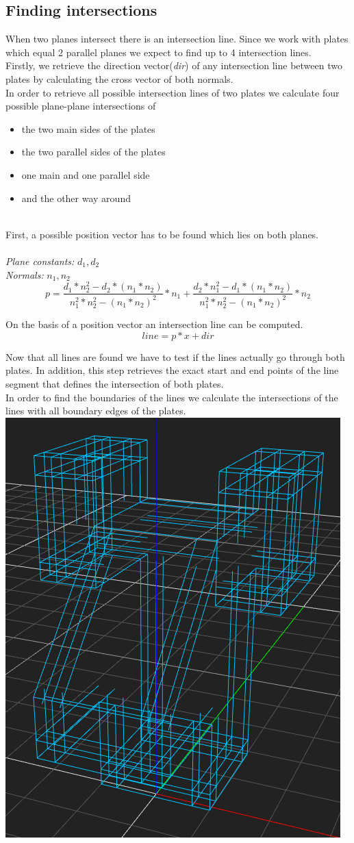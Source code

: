 \documentclass[../ClassicThesis.tex]{subfiles}
\begin{document}
\subsection{Finding intersections}
When two planes intersect there is an intersection line. Since we work with plates which equal 2 parallel planes we expect to find up to 4 intersection lines.\\
Firstly, we retrieve the direction vector(\emph{dir}) of any intersection line between two plates by calculating the cross vector of both normals.\\
In order to retrieve all possible intersection lines of two plates we calculate four possible plane-plane intersections \cite{planePlaneIntersection} of 
\begin{itemize}
\item the two main sides of the plates
\item the two parallel sides of the plates
\item one main and one parallel side 
\item and the other way around
\end{itemize}
\*\\
First, a possible position vector has to be found which lies on both planes.
\\\*\\
\emph{Plane constants:} $d_1, d_2$\\
\emph{Normals:} $n_1, n_2$
$$ p = \frac{d_1 * n_{2}^{2} - d_2 * (n_1 * n_2)}{n_{1}^{2} * n_{2}^{2} - (n_1 * n_2)^{2}} * n_1 + \frac{d_2*n_1^2 - d_1*(n_1 * n_2)}{n_1^2 * n_2^2 - (n_1 * n_2)^2} * n_2 $$

On the basis of a position vector an intersection line can be computed.
$$ line = p*x + dir$$

Now that all lines are found we have to test if the lines actually go through both plates. In addition, this step retrieves the exact start and end points of the line segment that defines the intersection of both plates.\\
In order to find the boundaries of the lines we calculate the intersections of the lines with all boundary edges of the plates.\\
\includegraphics[width=.5\columnwidth]{Images/HeadAllBoundaries.png}
\end{document}
